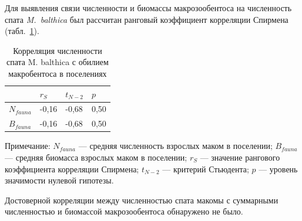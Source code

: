 Для выявления связи численности и биомассы макрозообентоса на численность спата {\it M.~balthica} был рассчитан ранговый коэффициент корреляции Спирмена (табл.~\ref{spat_fauna_correlation}). 
\begin{table}[h]
\caption{Корреляция численности спата M. balthica с обилием макробентоса в поселениях}
\label{spat_fauna_correlation}
\begin{center}
\begin{tabular}{|l|lll|}
\hline
     & $r_S$    & $t_{N-2}$   & $p$    \\ \hline
$N_{fauna}$  & -0,16 & -0,68 & 0,50 \\
$B_{fauna}$  & -0,16 & -0,68 & 0,50\\
\hline
\end{tabular}
\end{center}

\footnotesize{Примечание: $N_{fauna}$ --- средняя численность взрослых маком в поселении; 
$B_{fauna}$ --- средняя биомасса взрослых маком в поселении; 
$r_S$ --- значение рангового коэффициента корреляции Спирмена; 
$t_{N-2}$ --- критерий Стьюдента;   
$p$ --- уровень значимости нулевой гипотезы.}
\end{table}
Достоверной корреляции между численностью спата макомы с суммарными численностью и биомассой макрозообентоса обнаружено не было.
